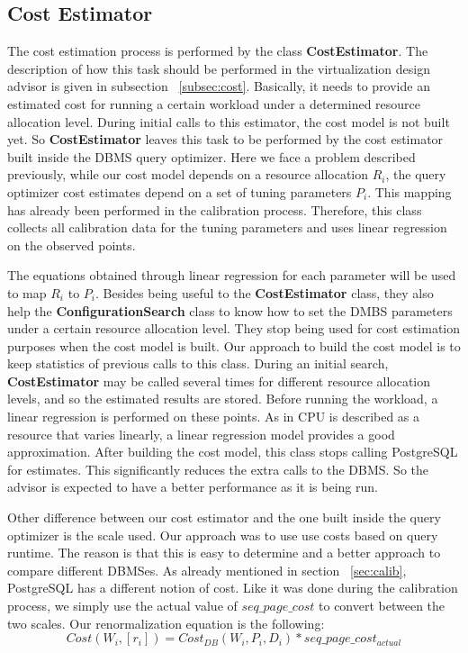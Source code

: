 \subsection{Cost Estimator}

The cost estimation process is performed by the class \textbf{CostEstimator}. The description of how this task should be performed in the virtualization design advisor is given in subsection ~\ref{subsec:cost}. Basically, it needs to provide an estimated cost for running a certain workload under a determined resource allocation level. During initial calls to this estimator, the cost model is not built yet. So \textbf{CostEstimator} leaves this task to be performed by the cost estimator built inside the DBMS query optimizer. Here we face a problem described previously, while our cost model depends on a resource allocation $R_{i}$, the query optimizer cost estimates depend on a set of tuning parameters $P_{i}$. This mapping has already been performed in the calibration process. Therefore, this class collects all calibration data for the tuning parameters and uses linear regression on the observed points. 

The equations obtained through linear regression for each parameter will be used to map $R_{i}$ to $P_{i}$. Besides being useful to the \textbf{CostEstimator} class, they also help the \textbf{ConfigurationSearch} class to know how to set the DMBS parameters under a certain resource allocation level. They stop being used for cost estimation purposes when the cost model is built. Our approach to build the cost model is to keep statistics of previous calls to this class. During an initial search, \textbf{CostEstimator} may be called several times for different resource allocation levels, and so the estimated results are stored. Before running the workload, a linear regression is performed on these points. As in \cite{Soror:2008:AVM:1376616.1376711} CPU is described as a resource that varies linearly, a linear regression model provides a good approximation. After building the cost model, this class stops calling PostgreSQL for estimates. This significantly reduces the extra calls to the DBMS. So the advisor is 
expected to have a better performance as it is being run.

Other difference between our cost estimator and the one built inside the query optimizer is the scale used. Our approach was to use use costs based on query runtime. The reason is that this is easy to determine and a better approach to compare different DBMSes. As already mentioned in section ~\ref{sec:calib}, PostgreSQL has a different notion of cost. Like it was done during the calibration process, we simply use the actual value of $seq\_page\_cost$ to convert between the two scales. Our renormalization equation is the following:
\[
 Cost(W_{i}, [r_{i}]) = Cost_{DB}(W_{i},P_{i},D_{i}) * seq\_page\_cost_{actual}
\]

